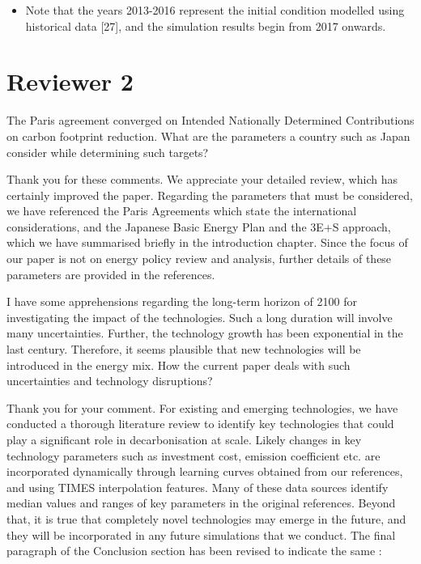 \documentclass[answers,11pt]{exam}
\begin{document}
\begin{questions}
\begin{solution}
\begin{itemize}
                \item Note that the years 2013-2016 represent the initial condition modelled using historical data [27], and the simulation results begin from 2017 onwards.
                
                \end{itemize}
                
        \end{solution}      
              
        
        \section*{Reviewer 2}

        \question The Paris agreement converged on Intended Nationally Determined Contributions on carbon footprint reduction. What are the parameters a country such as Japan consider while determining such targets?
        
        \begin{solution}
                Thank you for these comments. We appreciate your detailed review, which has certainly improved the paper. Regarding the parameters that must be considered, we have referenced the Paris Agreements which state the international considerations, and the Japanese Basic Energy Plan and the 3E+S approach, which we have summarised briefly in the introduction chapter. Since the focus of our paper is not on energy policy review and analysis, further details of these parameters are provided in the references.
        \end{solution}


        \question I have some apprehensions regarding the long-term horizon of 2100 for investigating the impact of the technologies. Such a long duration will involve many uncertainties. Further, the technology growth has been exponential in the last century. Therefore, it seems plausible that new technologies will be introduced in the energy mix. How the current paper deals with such uncertainties and technology disruptions?
        
        \begin{solution}
                 Thank you for your comment. For existing and emerging technologies, we have conducted a thorough literature review to identify key technologies that could play a significant role in decarbonisation at scale. Likely changes in key technology parameters such as investment cost, emission coefficient etc. are incorporated dynamically through learning curves obtained from our references, and using TIMES interpolation features. Many of these data sources identify median values and ranges of key parameters in the original references. Beyond that, it is true that completely novel technologies may emerge in the future, and they will be incorporated in any future simulations that we conduct. The final paragraph of the Conclusion section has been revised to indicate the same :
                 

\end{solution}
\end{questions}
\end{document}

